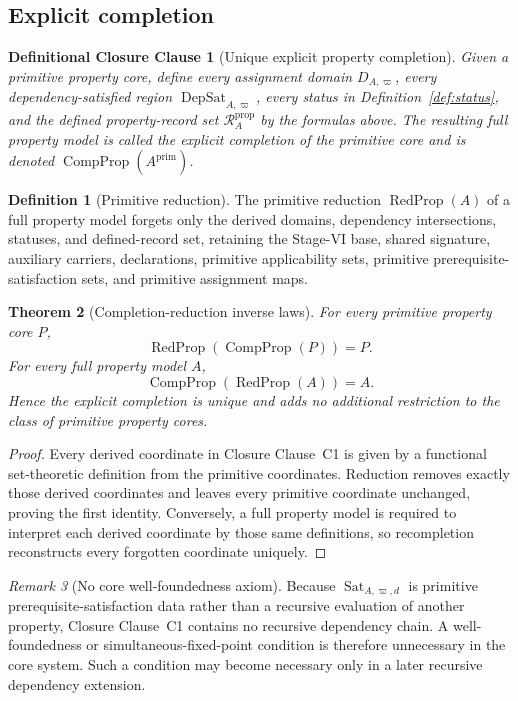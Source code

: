 \documentclass[11pt]{article}
\newcommand{\DepSat}{\operatorname{DepSat}}
\newcommand{\Sat}{\operatorname{Sat}}
\newcommand{\PropRec}{\mathcal R^{\mathrm{prop}}}
\newcommand{\CompProp}{\operatorname{CompProp}}
\newcommand{\RedProp}{\operatorname{RedProp}}
\newtheorem{closureclause}{Definitional Closure Clause}
\newtheorem{theorem}{Theorem}[section]
\theoremstyle{definition}
\newtheorem{definition}[theorem]{Definition}
\theoremstyle{remark}
\newtheorem{remark}[theorem]{Remark}
\begin{document}
\subsection{Explicit completion}

\begin{closureclause}[Unique explicit property completion]
\label{cl:completion}
Given a primitive property core, define every assignment domain \(D_{A,\varpi}\), every dependency-satisfied region \(\DepSat_{A,\varpi}\), every status in Definition~\ref{def:status}, and the defined property-record set \(\PropRec_A\) by the formulas above.
The resulting full property model is called the \emph{explicit completion} of the primitive core and is denoted \(\CompProp(A^{\mathrm{prim}})\).
\end{closureclause}

\begin{definition}[Primitive reduction]
The primitive reduction \(\RedProp(A)\) of a full property model forgets only the derived domains, dependency intersections, statuses, and defined-record set, retaining the Stage-VI base, shared signature, auxiliary carriers, declarations, primitive applicability sets, primitive prerequisite-satisfaction sets, and primitive assignment maps.
\end{definition}

\begin{theorem}[Completion-reduction inverse laws]
\label{thm:completion-inverse}
For every primitive property core \(P\),
\[
\RedProp(\CompProp(P))=P.
\]
For every full property model \(A\),
\[
\CompProp(\RedProp(A))=A.
\]
Hence the explicit completion is unique and adds no additional restriction to the class of primitive property cores.
\end{theorem}

\begin{proof}
Every derived coordinate in Closure Clause~C1 is given by a functional set-theoretic definition from the primitive coordinates.
Reduction removes exactly those derived coordinates and leaves every primitive coordinate unchanged, proving the first identity.
Conversely, a full property model is required to interpret each derived coordinate by those same definitions, so recompletion reconstructs every forgotten coordinate uniquely.
\end{proof}

\begin{remark}[No core well-foundedness axiom]
Because \(\Sat_{A,\varpi,d}\) is primitive prerequisite-satisfaction data rather than a recursive evaluation of another property, Closure Clause~C1 contains no recursive dependency chain.
A well-foundedness or simultaneous-fixed-point condition is therefore unnecessary in the core system.
Such a condition may become necessary only in a later recursive dependency extension.
\end{remark}
\end{document}
